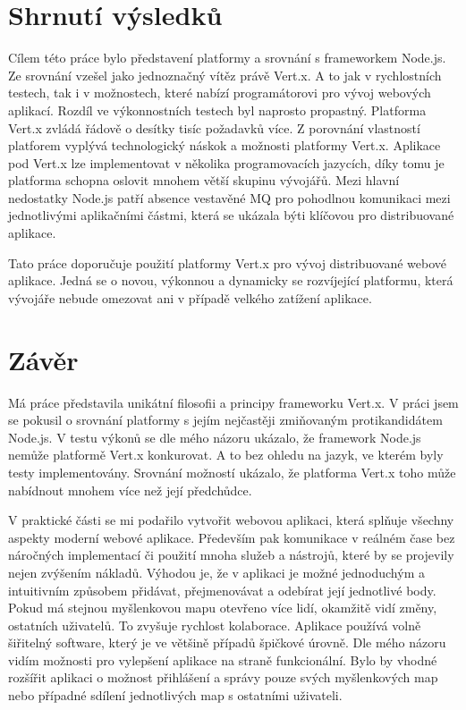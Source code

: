 
\chapter[Shrnutí výsledků]{Shrnutí výsledků}

Cílem této práce bylo představení platformy a srovnání s frameworkem Node.js. Ze srovnání vzešel jako jednoznačný vítěz  právě Vert.x. A to jak v rychlostních testech, tak i v možnostech, které nabízí programátorovi pro vývoj webových aplikací. Rozdíl ve výkonnostních testech byl naprosto propastný. Platforma Vert.x zvládá řádově o desítky tisíc požadavků více. Z porovnání vlastností platforem vyplývá technologický náskok a možnosti platformy Vert.x. Aplikace pod Vert.x lze implementovat v několika programovacích jazycích, díky tomu je platforma schopna oslovit mnohem větší skupinu vývojářů. Mezi hlavní nedostatky Node.js patří absence vestavěné MQ pro pohodlnou komunikaci mezi jednotlivými aplikačními částmi, která se ukázala býti klíčovou pro distribuované aplikace.

Tato práce doporučuje použití platformy Vert.x pro vývoj distribuované webové aplikace. Jedná se o novou, výkonnou a dynamicky se rozvíjející platformu, která vývojáře nebude omezovat ani v případě velkého zatížení aplikace.

\chapter[Závěr]{Závěr}

Má práce představila unikátní filosofii a principy frameworku Vert.x. V práci jsem se pokusil o srovnání platformy s jejím nejčastěji zmiňovaným protikandidátem Node.js. V testu výkonů se dle mého názoru ukázalo, že framework Node.js nemůže platformě Vert.x konkurovat. A to bez ohledu na jazyk, ve kterém byly testy implementovány. Srovnání možností ukázalo, že platforma Vert.x toho může nabídnout mnohem více než její předchůdce. 

V praktické části se  mi podařilo vytvořit webovou aplikaci, která splňuje všechny aspekty moderní webové aplikace. Především pak komunikace v reálném čase bez náročných implementací či použití mnoha služeb a nástrojů, které by se projevily nejen zvýšením nákladů. Výhodou je, že v aplikaci je možné jednoduchým a intuitivním způsobem přidávat, přejmenovávat a odebírat její jednotlivé body. Pokud má stejnou myšlenkovou mapu otevřeno více lidí, okamžitě vidí změny, ostatních uživatelů. To zvyšuje rychlost kolaborace. Aplikace používá volně šiřitelný software, který je ve většině případů špičkové úrovně. %
Dle mého názoru vidím možnosti pro vylepšení aplikace na straně funkcionální. Bylo by vhodné rozšířit aplikaci o možnost přihlášení a správy pouze svých myšlenkových map nebo případné sdílení jednotlivých map s ostatními uživateli.

